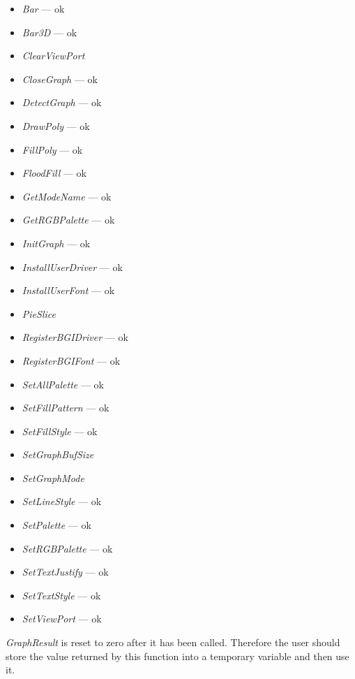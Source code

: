 \begin{itemize}
\item \textit{Bar}                      --- ok
\item \textit{Bar3D}                    --- ok
\item \textit{ClearViewPort}
\item \textit{CloseGraph}               --- ok
\item \textit{DetectGraph}              --- ok
\item \textit{DrawPoly}                 --- ok
\item \textit{FillPoly}                 --- ok
\item \textit{FloodFill}                --- ok
\item \textit{GetModeName}              --- ok
\item \textit{GetRGBPalette}            --- ok
\item \textit{InitGraph}                --- ok
\item \textit{InstallUserDriver}        --- ok
\item \textit{InstallUserFont}          --- ok
\item \textit{PieSlice}
\item \textit{RegisterBGIDriver}         --- ok
\item \textit{RegisterBGIFont}           --- ok
\item \textit{SetAllPalette}             --- ok
\item \textit{SetFillPattern}            --- ok
\item \textit{SetFillStyle}              --- ok
\item \textit{SetGraphBufSize}
\item \textit{SetGraphMode}
\item \textit{SetLineStyle}                --- ok
\item \textit{SetPalette}                 --- ok
\item \textit{SetRGBPalette}              --- ok
\item \textit{SetTextJustify}             --- ok
\item \textit{SetTextStyle}               --- ok
\item \textit{SetViewPort}                 --- ok
\end{itemize}

\textit{GraphResult} is reset to zero after it has been called. Therefore
the user should store the value returned by this function into a temporary
variable and then use it.

